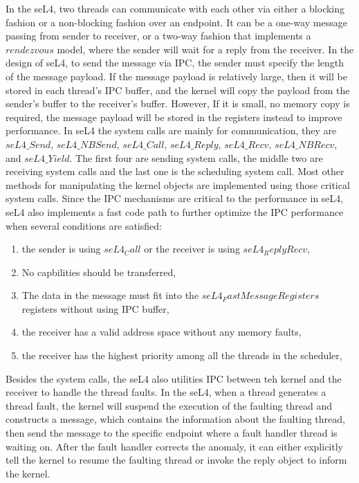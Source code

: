 In the seL4, two threads can communicate with each other via either a blocking fashion or a non-blocking fashion over an endpoint. It can be a one-way message passing from sender to receiver, or a two-way fashion that implements a $rendezvous$ model, where the sender will wait for a reply from the receiver. In the design of seL4, to send the message via IPC, the sender must specify the length of the message payload. If the message payload is relatively large, then it will be stored in each thread's IPC buffer, and the kernel will copy the payload from the sender's buffer to the receiver's buffer. However, If it is small, no memory copy is required, the message payload will be stored in the registers instead to improve performance. In seL4 the system calls are mainly for communication, they are $seL4\_Send$, $seL4\_NBSend$, $seL4\_Call$, $seL4\_Reply$, $seL4\_Recv$, $seL4\_NBRecv$, and $seL4\_Yield$. The first four are sending system calls, the middle two are receiving system calls and the last one is the scheduling system call. Most other methods for manipulating the kernel objects are implemented using those critical system calls. Since the IPC mechanisms are critical to the performance in seL4, seL4 also implements a fast code path to further optimize the IPC performance when several conditions are satisfied: 

\begin{enumerate}
    \item the sender is using $seL4_Call$ or the receiver is using $seL4_ReplyRecv$,
    \item No capbilities should be transferred,
    \item The data in the message must fit into the $seL4_FastMessageRegisters$ registers without using IPC buffer,
    \item the receiver has a valid address space without any memory faults,
    \item the receiver has the highest priority among all the threads in the scheduler,
\end{enumerate}

Besides the system calls, the seL4 also utilities IPC between teh kernel and the receiver to handle the thread faults. In the seL4, when a thread generates a thread fault, the kernel will suspend the execution of the faulting thread and constructs a message, which contains the information about the faulting thread, then send the message to the specific endpoint where a fault handler thread is waiting on. After the fault handler corrects the anomaly, it can either explicitly tell the kernel to resume the faulting thread or invoke the reply object to inform the kernel. 

